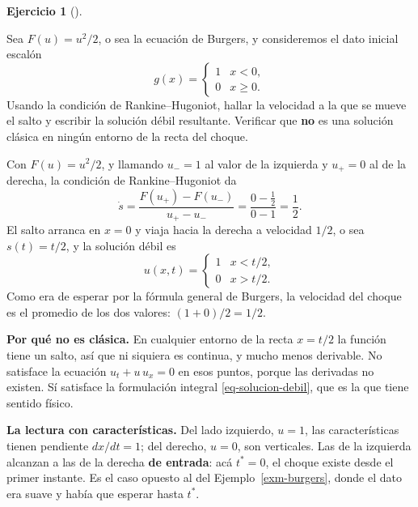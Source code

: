 \documentclass[
  spanish,
  a4paper,
]{scrbook}
\theoremstyle{definition}
\theoremstyle{plain}
\theoremstyle{definition}
\theoremstyle{plain}
\theoremstyle{definition}
\newtheorem{exercise}{Ejercicio}[chapter]
\theoremstyle{remark}
\begin{document}
\begin{exercise}[]\protect\hypertarget{exr-debil-escalon}{}\label{exr-debil-escalon}

Sea \(F(u) = u^2/2\), o sea la ecuación de Burgers, y consideremos el
dato inicial escalón
\[g(x) = \begin{cases} 1 & x < 0,\\ 0 & x \ge 0.\end{cases}\] Usando la
condición de Rankine--Hugoniot, hallar la velocidad a la que se mueve el
salto y escribir la solución débil resultante. Verificar que \textbf{no}
es una solución clásica en ningún entorno de la recta del choque.

\end{exercise}

\begin{tcolorbox}[enhanced jigsaw, arc=.35mm, bottomrule=.15mm, bottomtitle=1mm, breakable, colback=white, colbacktitle=quarto-callout-tip-color!10!white, colframe=quarto-callout-tip-color-frame, coltitle=black, left=2mm, leftrule=.75mm, opacityback=0, opacitybacktitle=0.6, rightrule=.15mm, title=\textcolor{quarto-callout-tip-color}{\faLightbulb}\hspace{0.5em}{Solución}, titlerule=0mm, toprule=.15mm, toptitle=1mm]

Con \(F(u) = u^2/2\), y llamando \(u_- = 1\) al valor de la izquierda y
\(u_+ = 0\) al de la derecha, la condición de Rankine--Hugoniot da \[
\dot s = \frac{F(u_+) - F(u_-)}{u_+ - u_-} = \frac{0 - \tfrac12}{0 - 1} = \frac12 .
\] El salto arranca en \(x=0\) y viaja hacia la derecha a velocidad
\(1/2\), o sea \(s(t) = t/2\), y la solución débil es \[
u(x,t) = \begin{cases} 1 & x < t/2,\\ 0 & x > t/2.\end{cases}
\] Como era de esperar por la fórmula general de Burgers, la velocidad
del choque es el promedio de los dos valores: \((1+0)/2 = 1/2\).

\textbf{Por qué no es clásica.} En cualquier entorno de la recta
\(x = t/2\) la función tiene un salto, así que ni siquiera es continua,
y mucho menos derivable. No satisface la ecuación \(u_t + u\,u_x = 0\)
en esos puntos, porque las derivadas no existen. Sí satisface la
formulación integral \ref{eq-solucion-debil}, que es la que tiene
sentido físico.

\textbf{La lectura con características.} Del lado izquierdo, \(u=1\),
las características tienen pendiente \(dx/dt = 1\); del derecho,
\(u=0\), son verticales. Las de la izquierda alcanzan a las de la
derecha \textbf{de entrada}: acá \(t^{*} = 0\), el choque existe desde
el primer instante. Es el caso opuesto al del Ejemplo~\ref{exm-burgers},
donde el dato era suave y había que esperar hasta \(t^{*}\).

\end{tcolorbox}
\end{document}
